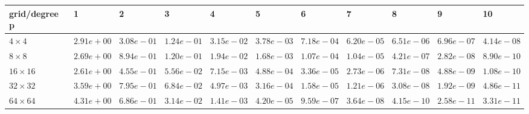 \begin{tabular}{lllllllllll}
\hline
 grid/degree p   & 1          & 2          & 3          & 4          & 5          & 6          & 7          & 8          & 9          & 10         \\
\hline
 $4 \times 4$    & $2.91e+00$ & $3.08e-01$ & $1.24e-01$ & $3.15e-02$ & $3.78e-03$ & $7.18e-04$ & $6.20e-05$ & $6.51e-06$ & $6.96e-07$ & $4.14e-08$ \\
 $8 \times 8$    & $2.69e+00$ & $8.94e-01$ & $1.20e-01$ & $1.94e-02$ & $1.68e-03$ & $1.07e-04$ & $1.04e-05$ & $4.21e-07$ & $2.82e-08$ & $8.90e-10$ \\
 $16 \times 16$  & $2.61e+00$ & $4.55e-01$ & $5.56e-02$ & $7.15e-03$ & $4.88e-04$ & $3.36e-05$ & $2.73e-06$ & $7.31e-08$ & $4.88e-09$ & $1.08e-10$ \\
 $32 \times 32$  & $3.59e+00$ & $7.95e-01$ & $6.84e-02$ & $4.97e-03$ & $3.16e-04$ & $1.58e-05$ & $1.21e-06$ & $3.08e-08$ & $1.92e-09$ & $4.86e-11$ \\
 $64 \times 64$  & $4.31e+00$ & $6.86e-01$ & $3.14e-02$ & $1.41e-03$ & $4.20e-05$ & $9.59e-07$ & $3.64e-08$ & $4.15e-10$ & $2.58e-11$ & $3.31e-11$ \\
\hline
\end{tabular}